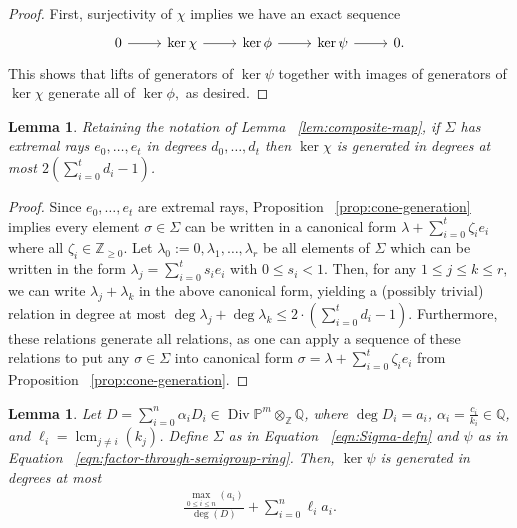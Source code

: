 \documentclass{amsart}
\theoremstyle{plain}
\newtheorem{lem}[thm]{Lemma}
\theoremstyle{definition}
\theoremstyle{remark}
\numberwithin{equation}{section}
\newcommand\bq{{\mathbb Q}}
\newcommand\bp{{\mathbb P}}
\newcommand\bz{{\mathbb Z}}
\DeclareMathOperator\di{Div}
\newcommand\bida{a}
\DeclareMathOperator{\lcm}{lcm}
\begin{document}
\begin{proof}
First, surjectivity of $\chi$ implies we have an exact sequence
\[
\begin{tikzcd}
0 \ar {r} & \ker \chi \ar{r} & \ker \phi \ar {r} & \ker \psi \ar r & 0.
\end{tikzcd}
\]
This shows that lifts of generators of $\ker \psi$ together with images of
generators of $\ker \chi$ generate all of $\ker \phi,$ as desired. 
\end{proof}

\begin{lem}
\label{lem:bound-ker-chi}
Retaining the notation of Lemma ~\ref{lem:composite-map}, if $\Sigma$ has
extremal rays $e_0,\ldots, e_t$ in degrees $d_0, \ldots, d_t$ then $\ker \chi$
is generated in degrees at most $2(\sum_{i=0}^{t}d_i-1)$.
\end{lem}
\begin{proof}
Since $e_0, \ldots, e_t$ are extremal rays, Proposition
~\ref{prop:cone-generation} implies every element $\sigma \in \Sigma$ can be written
in a canonical form $\lambda + \sum_{i=0}^{t} \zeta_i e_i$ where all $\zeta_i \in \mathbb{Z}_{\ge 0}$.  Let
$\lambda_0 :=
0,\lambda_1, \ldots, \lambda_r$ be all elements of $\Sigma$ which
can be
written in the form $\lambda_j = \sum_{i=0}^{t}s_i e_i$ with $0
\leq s_i < 1.$ Then, for any $1 \leq j \leq k \leq r,$ we can write $\lambda_j + \lambda_k$ in
the above canonical form, yielding a (possibly trivial) relation in degree at most $\deg \lambda_j
+ \deg \lambda_k\leq 2 \cdot \left( \sum_{i=0}^{t}d_i -1 \right).$
Furthermore, these relations generate all relations, as one can apply a
sequence of these relations to put any $\sigma \in \Sigma$ into canonical form
$\sigma = \lambda + \sum_{i=0}^{t}\zeta_i e_i$ from Proposition
~\ref{prop:cone-generation}.
\end{proof}
\begin{lem}
\label{lem:proj-relations-psi}
Let $D = \sum_{i=0}^{n} \alpha_i D_i \in \di \bp^m \otimes_\bz \bq$, where
$\deg D_i = \bida_i$, $\alpha_i = \frac{c_i}{k_i}\in \bq$, and
$\ell_i = \lcm_{j \neq i} (k_j)$. Define $\Sigma$ as in Equation
~\eqref{eqn:Sigma-defn} and $\psi$ as in Equation
~\eqref{eqn:factor-through-semigroup-ring}. Then, $\ker \psi$ is
generated in degrees at most
\begin{align}
\label{eqn:proj-relation-degree}
	\frac{\max_{0 \le i \le n}(\bida_i)}{\deg(D)} +  \sum_{i=0}^n \ell_i a_i.
\end{align}

\end{lem}
\end{document}
